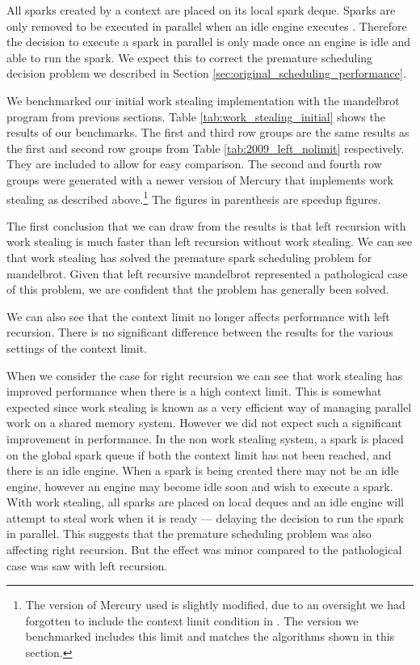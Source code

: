 All sparks created by a context are placed on its local spark deque.
Sparks are only removed to be executed in parallel when an idle engine
executes \trystealspark.
Therefore
the decision to execute a spark in parallel is only made once an engine is
idle and able to run the spark.
We expect this to correct the premature scheduling decision problem we
described in Section \ref{sec:original_scheduling_performance}.



We benchmarked our initial work stealing implementation with the mandelbrot
program from previous sections.
Table \ref{tab:work_stealing_initial} shows the results of our benchmarks.
The first and third row groups are the same results as the first and second
row groups from Table \ref{tab:2009_left_nolimit} respectively.
They are included to allow for easy comparison.
The second and fourth row groups were generated with a newer version of
Mercury that implements work stealing as described above.\footnote{
    The version of Mercury used is slightly modified,
    due to an oversight we had forgotten to include the context limit
    condition in \getglobalwork.
    The version we benchmarked includes this limit and matches the
    algorithms shown in this section.}
The figures in parenthesis are speedup figures.

The first conclusion that we can draw from the results is that
left recursion with work stealing is much faster than left recursion without
work stealing.
We can see that work stealing has solved the premature spark scheduling problem
for mandelbrot.
Given that left recursive mandelbrot represented a pathological case of this
problem,
we are confident that the problem has generally been solved.

We can also see that the context limit no longer affects performance
with left recursion.
There is no significant difference between the results for the various
settings of the context limit.

When we consider the case for right recursion we can see that
work stealing has improved performance when there is a 
high context limit.
This is somewhat expected since work stealing is known as a very
efficient way of managing parallel work on a shared memory system.
However we did not expect such a significant improvement in
performance.
In the non work stealing system,
a spark is placed on the global spark queue if both the context limit has
not been reached,
and there is an idle engine.
When a spark is being created there may not be an idle engine,
however an engine may become idle soon and wish to execute a spark.
With work stealing,
all sparks are placed on local deques and an idle
engine will attempt to steal work when it is ready ---
delaying the decision to run the spark in parallel.
This suggests that the premature scheduling problem was also affecting right
recursion.
But the effect was minor compared to the pathological case was saw with left
recursion.

